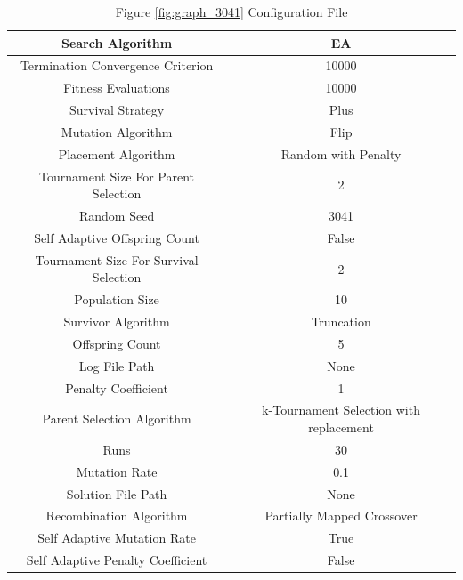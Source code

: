 \documentclass{standalone}
\begin{document}
\clearpage
\begin{table}[!htb]
	\centering
	\caption{Figure \ref{fig:graph_3041} Configuration File}
	\label{tab:graph_3041}
	\begin{tabular}{| c | c |}
		\hline
		Search Algorithm		& EA		 \\
		\hline
		Termination Convergence Criterion		& 10000		 \\
		\hline
		Fitness Evaluations		& 10000		 \\
		\hline
		Survival Strategy		& Plus		 \\
		\hline
		Mutation Algorithm		& Flip		 \\
		\hline
		Placement Algorithm		& Random with Penalty		 \\
		\hline
		Tournament Size For Parent Selection		& 2		 \\
		\hline
		Random Seed		& 3041		 \\
		\hline
		Self Adaptive Offspring Count		& False		 \\
		\hline
		Tournament Size For Survival Selection		& 2		 \\
		\hline
		Population Size		& 10		 \\
		\hline
		Survivor Algorithm		& Truncation		 \\
		\hline
		Offspring Count		& 5		 \\
		\hline
		Log File Path		& None		 \\
		\hline
		Penalty Coefficient		& 1		 \\
		\hline
		Parent Selection Algorithm		& k-Tournament Selection with replacement		 \\
		\hline
		Runs		& 30		 \\
		\hline
		Mutation Rate		& 0.1		 \\
		\hline
		Solution File Path		& None		 \\
		\hline
		Recombination Algorithm		& Partially Mapped Crossover		 \\
		\hline
		Self Adaptive Mutation Rate		& True		 \\
		\hline
		Self Adaptive Penalty Coefficient		& False		 \\
		\hline
	\end{tabular}
\end{table}
\end{document}

